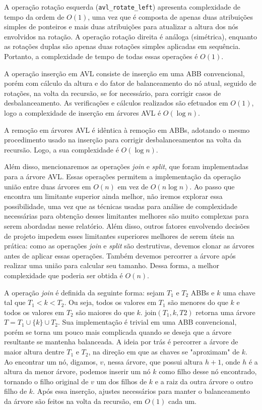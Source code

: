 \documentclass[a4paper,12pt]{report}
\begin{document}
A operação rotação esquerda (\texttt{avl\_rotate\_left}) apresenta complexidade de 
tempo da ordem de $O(1)$, uma vez que é composta de apenas duas atribuições simples
de ponteiros e mais duas atribuições para atualizar a altura dos nós envolvidos
na rotação. A operação rotação direita é análoga (simétrica), enquanto as rotações
duplas são apenas duas rotações simples aplicadas em sequência. Portanto, a
complexidade de tempo de todas essas operações é $O(1)$.

A operação inserção em AVL consiste de inserção em uma ABB convencional, porém com
cálculo da altura e do fator de balanceamento do nó atual, seguido de rotações, na
volta da recursão, se for necessário, para corrigir casos de desbalanceamento.
As verificações e cálculos realizados são efetuados em $O(1)$, logo a complexidade
de inserção em árvores AVL é $O(\log n)$.

A remoção em árvores AVL é idêntica à remoção em ABBs, adotando o mesmo procedimento 
usado na inserção para corrigir desbalanceamentos na volta da recursão. 
Logo, a sua complexidade é $O(\log n)$.

Além disso, mencionaremos as operações \textit{join} e \textit{split}, que foram 
implementadas para a árvore AVL. Essas operações permitem a implementação da operação 
união entre duas árvores em $O(n)$ em vez de $O(n \log n)$. Ao passo que \cite{bfs16}
encontra um limitante superior ainda melhor, não iremos explorar essa possibilidade, 
uma vez que as técnicas usadas para análise de complexidade necessárias para obtenção 
desses limitantes melhores são muito complexas para serem abordadas nesse relatório. 
Além disso, outros fatores envolvendo decisões de projeto impedem esses limitantes 
superiores melhores de serem úteis na prática: como as operações \textit{join} e 
\textit{split} são destrutivas, devemos clonar as árvores antes de aplicar essas operações. 
Também devemos percorrer a árvore após realizar uma união para calcular seu tamanho. 
Dessa forma, a melhor complexidade que poderia ser obtida é $O(n)$.

A operação \textit{join} é definida da seguinte forma: sejam $T_1$ e $T_2$ ABBs e $k$ uma 
chave tal que $T_1 < k < T_2$. Ou seja, todos os valores em $T_1$ são menores do que $k$ 
e todos os valores em $T_2$ são maiores do que $k$. $\textrm{join}(T_1, k, T2)$ retorna uma 
árvore $T = T_1 \cup \{k\} \cup T_2$. Sua implementação é trivial em uma ABB convencional, 
porém se torna um pouco mais complicada quando se deseja que a árvore resultante se mantenha 
balanceada. A ideia por trás é percorrer a árvore de maior altura dentre $T_1$ e $T_2$, na 
direção em que as chaves se "aproximam" de $k$. Ao encontrar um nó, digamos, $v$, nessa árvore,
que possui altura $h + 1$, onde $h$ é a altura da menor árvore, podemos inserir um nó $k$ 
como filho desse nó encontrado, tornando o filho original de $v$ um dos filhos de $k$ e a 
raiz da outra árvore o outro filho de $k$. Após essa inserção, ajustes necessários para 
manter o balanceamento da árvore são feitos na volta da recursão, em $O(1)$ cada um.
\end{document}
